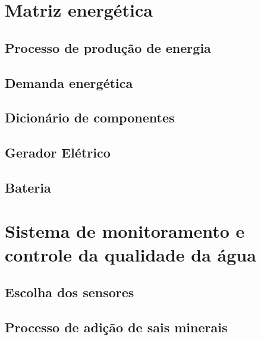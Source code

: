    
  \section{Matriz energética}
  	\subsection{Processo de produção de energia}
  		
  	\subsection{Demanda energética}
  		
  	\subsection{Dicionário de componentes}
  		
  	\subsection{Gerador Elétrico}
  		
  	\subsection{Bateria}
  		
    
  \section{Sistema de monitoramento e controle da qualidade da água}
    
    \subsection{Escolha dos sensores}
      
      
      
      
      
    
    \pagebreak
    \subsection{Processo de adição de sais minerais}
    
